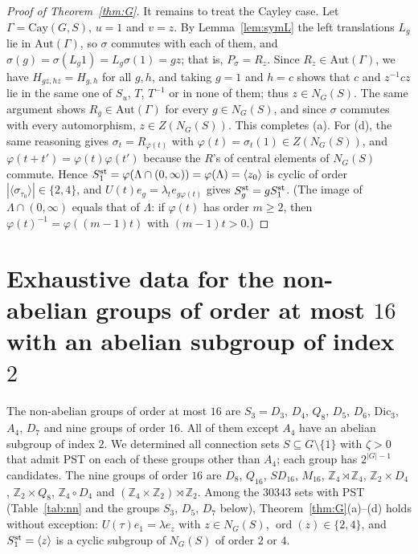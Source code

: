 \documentclass[preprint,11pt]{elsarticle}
\theoremstyle{definition}
\theoremstyle{remark}
\DeclareMathOperator{\ord}{ord}
\newcommand{\Z}{\mathbb Z}
\begin{document}
\begin{proof}[Proof of Theorem~\ref{thm:G}]
It remains to treat the Cayley case. Let $\Gamma=\mathrm{Cay}(G,S)$, $u=1$ and $v=z$. By Lemma~\ref{lem:symL} the left translations $L_g$ lie in $\mathrm{Aut}(\Gamma)$, so $\sigma$ commutes with each of them, and $\sigma(g)=\sigma(L_g1)=L_g\sigma(1)=gz$; that is, $P_\sigma=R_z$. Since $R_z\in\mathrm{Aut}(\Gamma)$, we have $H_{gz,hz}=H_{g,h}$ for all $g,h$, and taking $g=1$ and $h=c$ shows that $c$ and $z^{-1}cz$ lie in the same one of $S_u$, $T$, $T^{-1}$ or in none of them; thus $z\in N_G(S)$. The same argument shows $R_g\in\mathrm{Aut}(\Gamma)$ for every $g\in N_G(S)$, and since $\sigma$ commutes with every automorphism, $z\in Z(N_G(S))$. This completes (a). For (d), the same reasoning gives $\sigma_t=R_{\varphi(t)}$ with $\varphi(t)=\sigma_t(1)\in Z(N_G(S))$, and $\varphi(t+t')=\varphi(t)\varphi(t')$ because the $R$'s of central elements of $N_G(S)$ commute. Hence $S_1^{\rm st}=\varphi(\Lambda\cap(0,\infty))=\varphi(\Lambda)=\langle z_0\rangle$ is cyclic of order $|\langle\sigma_{\tau_0}\rangle|\in\{2,4\}$, and $U(t)e_g=\lambda_te_{g\varphi(t)}$ gives $S^{\rm st}_g=gS^{\rm st}_1$. (The image of $\Lambda\cap(0,\infty)$ equals that of $\Lambda$: if $\varphi(t)$ has order $m\ge2$, then $\varphi(t)^{-1}=\varphi((m-1)t)$ with $(m-1)t>0$.)
\end{proof}

\section{Exhaustive data for the non-abelian groups of order at most $16$ with an abelian subgroup of index $2$}\label{sec:search}

The non-abelian groups of order at most $16$ are $S_3=D_3$, $D_4$, $Q_8$, $D_5$, $D_6$, $\mathrm{Dic}_3$, $A_4$, $D_7$ and nine groups of order $16$. All of them except $A_4$ have an abelian subgroup of index $2$. We determined all connection sets $S\subseteq G\setminus\{1\}$ with $\zeta>0$ that admit PST on each of these groups other than $A_4$; each group has $2^{|G|-1}$ candidates. The nine groups of order $16$ are $D_8$, $Q_{16}$, $SD_{16}$, $M_{16}$, $\Z_4\rtimes\Z_4$, $\Z_2\times D_4$, $\Z_2\times Q_8$, $\Z_4\circ D_4$ and $(\Z_4\times\Z_2)\rtimes\Z_2$. Among the $30343$ sets with PST (Table~\ref{tab:nn} and the groups $S_3$, $D_5$, $D_7$ below), Theorem~\ref{thm:G}(a)--(d) holds without exception: $U(\tau)e_1=\lambda e_z$ with $z\in N_G(S)$, $\ord(z)\in\{2,4\}$, and $S_1^{\rm st}=\langle z\rangle$ is a cyclic subgroup of $N_G(S)$ of order $2$ or $4$.
\end{document}
